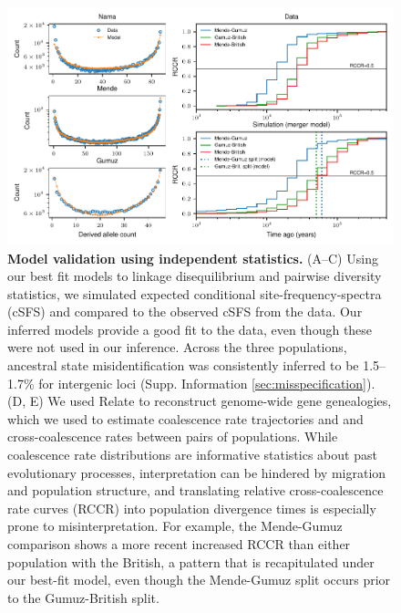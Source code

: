 \documentclass[]{article}
\begin{document}
\begin{figure}[t!]
    \centering
    \includegraphics{figures/validation}
    \caption{
        \textbf{Model validation using independent statistics.} (A--C) Using
        our best fit models to linkage disequilibrium and pairwise diversity statistics,
        we simulated expected conditional site-frequency-spectra (cSFS) and
        compared to the observed cSFS from the data. Our inferred models
        provide a good fit to the data, even though these were not used in our
        inference. Across the three populations, ancestral state
        misidentification was consistently inferred to be 1.5--1.7\% for
        intergenic loci (Supp. Information \ref{sec:misspecification}). (D, E) We used Relate
        \citep{Speidel2019-nj} to reconstruct genome-wide gene genealogies,
        which we used to estimate coalescence rate trajectories and
        and cross-coalescence rates between pairs of populations. While
        coalescence rate distributions are informative statistics about past
        evolutionary processes, interpretation can be hindered by migration and
        population structure, and translating relative cross-coalescence rate
        curves (RCCR) into population divergence times is especially prone
        to misinterpretation. For example, the Mende-Gumuz comparison shows
        a more recent increased RCCR than either population with the British,
        a pattern that is recapitulated under our best-fit model, even though
        the Mende-Gumuz split occurs prior to the Gumuz-British split.
    }
    \label{fig:validation}
\end{figure}
\end{document}
